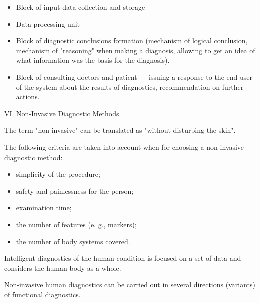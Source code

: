 \documentclass[twocolumn]{scndocument}
\begin{document}
\vspace{-5pt}
\begin{itemize}
    \setlength{\itemsep}{-3pt} 
    \setlength{\parsep}{-3pt}
    \item Block of input data collection and storage
    \item Data processing unit
    \item Block of diagnostic conclusions formation (mechanism of logical conclusion, mechanism of "reasoning" when making a diagnosis, allowing to get
an idea of what information was the basis for the
diagnosis).
    \item Block of consulting doctors and patient — issuing
a response to the end user of the system about the
results of diagnostics, recommendation on further
actions.
\end{itemize}
\vspace{-5pt}

\begin{center}
\vspace{-3pt}
VI. Non-Invasive Diagnostic Methods
\vspace{-3pt}
\end{center}

The term "non-invasive" can be translated as "without
disturbing the skin".

The following criteria are taken into account when for
choosing a non-invasive diagnostic method:

\vspace{-5pt}
\begin{itemize}
    \setlength{\itemsep}{-3pt} 
    \setlength{\parsep}{-3pt}
    \item simplicity of the procedure;
    \item safety and painlessness for the person;
    \item examination time;
    \item the number of features (e. g., markers);
    \item the number of body systems covered.
\end{itemize}
\vspace{-5pt}

Intelligent diagnostics of the human condition is focused on a set of data and considers the human body as
a whole.

Non-invasive human diagnostics can be carried out in
several directions (variants) of functional diagnostics.
\end{document}
